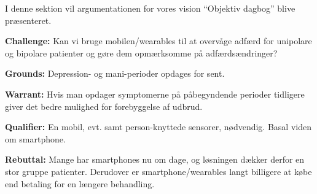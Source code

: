 I denne sektion vil argumentationen for vores vision ``Objektiv dagbog'' blive præsenteret.

\textbf{Challenge:} Kan vi bruge mobilen/wearables til at overvåge adfærd for unipolare og bipolare patienter og gøre dem opmærksomme på adfærdsændringer?

\textbf{Grounds:} Depression- og mani-perioder opdages for sent.

\textbf{Warrant:} Hvis man opdager symptomerne på påbegyndende perioder tidligere giver det bedre mulighed for forebyggelse af udbrud.

\textbf{Qualifier:} En mobil, evt. samt person-knyttede sensorer, nødvendig. Basal viden om smartphone.

\textbf{Rebuttal:} Mange har smartphones nu om dage, og løsningen dækker derfor en stor gruppe patienter. Derudover er smartphone/wearables langt billigere at købe end betaling for en længere behandling.



